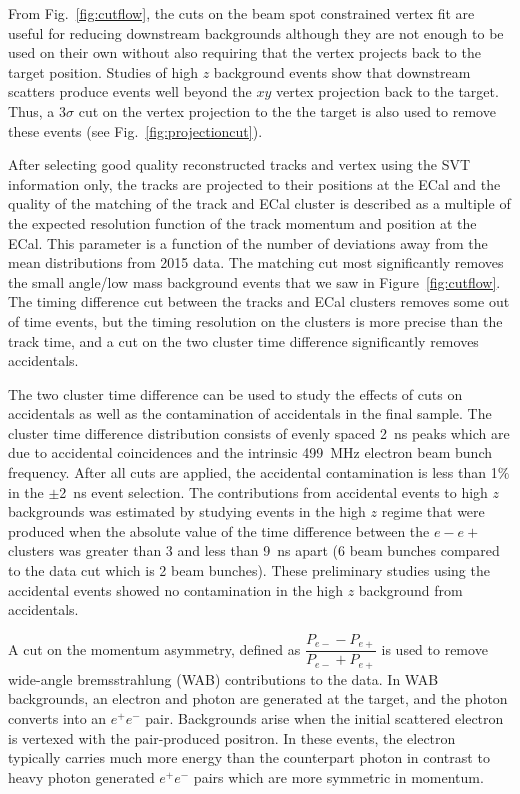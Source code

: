\documentclass[twocolumn, showpacs, preprintnumbers,prd, superscriptaddress]{revtex4-1}
\begin{document}
From Fig.~\ref{fig:cutflow}, the cuts on the beam spot constrained vertex fit are useful for reducing downstream backgrounds although they are not enough to be used on their own without also requiring that the vertex projects back to the target position. Studies of high $z$ background events show that downstream scatters produce events well beyond the $xy$ vertex projection back to the target. Thus, a 3$\sigma$ cut on the vertex projection to the the target is also used to remove these events (see Fig.~\ref{fig:projectioncut}).

After selecting good quality reconstructed tracks and vertex using the SVT information only, the tracks are projected to their positions at the ECal and the quality of the matching of the track and ECal cluster is described as a multiple of the expected resolution function of the track momentum and position at the ECal. This parameter is a function of the number of deviations away from the mean distributions from 2015 data. The matching cut most significantly removes the small angle/low mass background events that we saw in Figure~\ref{fig:cutflow}. The timing difference cut between the tracks and ECal clusters removes some out of time events, but the timing resolution on the clusters is more precise than the track time, and a cut on the two cluster time difference significantly removes accidentals.

The two cluster time difference can be used to study the effects of cuts on accidentals as well as the contamination of accidentals in the final sample. The cluster time difference distribution consists of evenly spaced 2~ns peaks which are due to accidental coincidences and the intrinsic 499~MHz electron beam bunch frequency. After all cuts are applied, the accidental contamination is less than 1$\%$ in the $\pm$2~ns event selection. The contributions from accidental events to high $z$ backgrounds was estimated by studying events in the high $z$ regime that were produced when the absolute value of the time difference between the $e-e+$ clusters was greater than 3 and less than 9~ns apart (6 beam bunches compared to the data cut which is 2 beam bunches). These preliminary studies using the accidental events showed no contamination in the high $z$ background from accidentals.

A cut on the momentum asymmetry, defined as $\dfrac{P_{e-} - P_{e+}}{P_{e-}+P_{e+}}$ is used to remove wide-angle bremsstrahlung (WAB) contributions to the data. In WAB backgrounds, an electron and photon are generated at the target, and the photon converts into an $e^+e^-$ pair. Backgrounds arise when the initial scattered electron is vertexed with the pair-produced positron. In these events, the electron typically carries much more energy than the counterpart photon in contrast to heavy photon generated $e^+e^-$ pairs which are more symmetric in momentum. 
\end{document}
